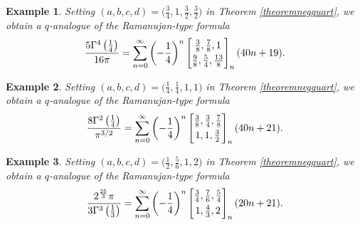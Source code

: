 \documentclass[12pt]{article}
\newtheorem{example}{Example}
\begin{document}
 \begin{example}
 Setting $(a, b, c, d) = \big( \frac{3}{4}, 1, \frac{3}{2}, \frac{3}{2} \big)$ in Theorem \ref{theoremnegquart}, we obtain 
 a $q$-analogue of the Ramanujan-type formula 
\begin{equation*}
 \frac{5 \Gamma^{4}\left( \frac{1}{4} \right) }{16 \pi} = 
 \sum_{n = 0}^{\infty} 
 \left( -\frac{1}{4} \right)^{n} \left[ \begin{matrix} 
 \frac{3}{8}, \frac{7}{8}, 1 
 \vspace{1mm} \\ 
 \frac{9}{8}, \frac{5}{4}, \frac{13}{8} 
 \end{matrix} \right]_{n} (40 n + 19). 
 \end{equation*}
\end{example}

\begin{example}
 Setting $(a, b, c, d) = \big( \frac{1}{4}, \frac{1}{4}, 1, 1 \big)$ in Theorem \ref{theoremnegquart}, we obtain 
 a $q$-analogue of the Ramanujan-type formula 
\begin{equation*}
 \frac{8 \Gamma^{2}\left( \frac{1}{4} \right) }{\pi^{3/2}} = 
 \sum_{n = 0}^{\infty} 
 \left( -\frac{1}{4} \right)^{n} \left[ \begin{matrix} 
 \frac{3}{8}, \frac{3}{4}, \frac{7}{8} 
 \vspace{1mm} \\ 
 1, 1, \frac{3}{2}
 \end{matrix} \right]_{n} (40 n + 21). 
 \end{equation*}
\end{example}

 \begin{example}
 Setting $(a, b, c, d) = \big( \frac{1}{2}, \frac{5}{6}, 1, 2 \big)$ in Theorem \ref{theoremnegquart}, we obtain 
 a $q$-analogue of the Ramanujan-type formula 
\begin{equation*}
 \frac{2^{\frac{25}{3}} \pi}{3 \Gamma^{3}\left( \frac{1}{3} \right) } = 
 \sum_{n = 0}^{\infty} 
 \left( -\frac{1}{4} \right)^{n} \left[ \begin{matrix} 
 \frac{3}{4}, \frac{7}{6}, \frac{5}{4} 
 \vspace{1mm} \\ 
 1, \frac{4}{3}, 2 
 \end{matrix} \right]_{n} (20 n + 21). 
 \end{equation*}
\end{example}
\end{document}
